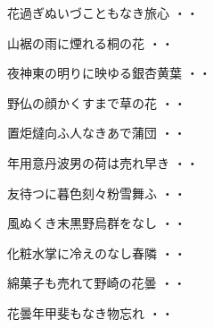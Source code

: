 \vspace{0.4cm}
\begin{shiika}花過ぎぬいづこともなき旅心
\hfill{・・}\end{shiika}
\vspace{0.4cm}
\begin{shiika}山裾の雨に煙れる桐の花
\hfill{・・}\end{shiika}
\vspace{0.4cm}
\begin{shiika}夜神東の明りに映ゆる銀杏黄葉
\hfill{・・}\end{shiika}
\vspace{0.4cm}
\begin{shiika}野仏の顔かくすまで草の花
\hfill{・・}\end{shiika}
\vspace{0.4cm}
\begin{shiika}置炬燵向ふ人なきあで蒲団
\hfill{・・}\end{shiika}
\vspace{0.4cm}
\begin{shiika}年用意丹波男の荷は売れ早き
\hfill{・・}\end{shiika}
\vspace{0.4cm}
\begin{shiika}友待つに暮色刻々粉雪舞ふ
\hfill{・・}\end{shiika}
\vspace{0.4cm}
\begin{shiika}風ぬくき末黒野烏群をなし
\hfill{・・}\end{shiika}
\vspace{0.4cm}
\begin{shiika}化粧水掌に冷えのなし春隣
\hfill{・・}\end{shiika}
\vspace{0.4cm}
\begin{shiika}綿菓子も売れて野崎の花曇
\hfill{・・}\end{shiika}
\vspace{0.4cm}
\begin{shiika}花曇年甲斐もなき物忘れ
\hfill{・・}\end{shiika}
